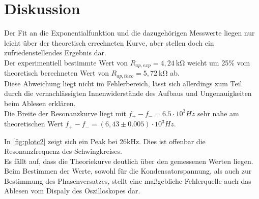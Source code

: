 \section{Diskussion}
\label{sec:Diskussion}


Der Fit an die Exponentialfunktion und die dazugehörigen Messwerte liegen nur leicht über der theoretisch 
errechneten Kurve, aber stellen doch ein zufriedenstellendes Ergebnis dar. \\




Der experimentiell bestimmte Wert von $R_{ap,exp} = 4,24 \: \mathrm{k\Omega}$ weicht um 25\% vom theoretisch berechneten Wert von 
$R_{ap,theo} = 5,72 \: \mathrm{k\Omega}$ ab. \\
Diese Abweichung liegt nicht im Fehlerbereich, lässt sich allerdings zum Teil durch die vernachlässigten Innenwiderstände des Aufbaus und Ungenauigkeiten
beim Ablesen erklären.\\


Die Breite der Resonanzkurve liegt mit $f_+ - f_- = 6.5 \cdot 10^3 Hz$ sehr nahe am theoretischen Wert $f_+ - f_- = (6,43 \pm 0.005) \cdot 10^3 Hz$. 

In \autoref{fig:plotc2} zeigt sich ein Peak bei 26kHz. Dies ist offenbar die Resonanzfrequenz
des Schwingkreises. \\
Es fällt auf, dass die Theoriekurve deutlich über den gemessenen Werten liegen.\\ %

Beim Bestimmen der Werte, sowohl für die Kondensatorspannung, als auch zur Bestimmung des Phasenversatzes, stellt eine 
maßgebliche Fehlerquelle auch das Ablesen vom Dispaly des Oszilloskopes dar.\\ 

